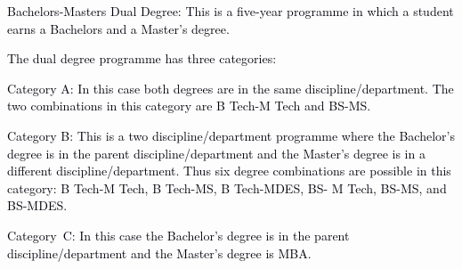 \documentclass[12pt]{article}
\begin{document}
\vspace{\baselineskip}
{\fontsize{9pt}{10.8pt}\selectfont \textcolor[HTML]{00000A}{Bachelors-Masters Dual Degree: This is a five-year programme in which a student earns a Bachelors and a Master’s degree.}\par}\par


\vspace{\baselineskip}
{\fontsize{10pt}{12.0pt}\selectfont \textcolor[HTML]{00000A}{The dual degree programme has three categories:}\par}\par


\vspace{\baselineskip}
\begin{adjustwidth}{0.71in}{0.04in}
{\fontsize{10pt}{12.0pt}\selectfont \textcolor[HTML]{00000A}{Category A: In this case both degrees are in the same discipline/department. The two combinations in this category are B Tech-M Tech and BS-MS.}\par}\par

\end{adjustwidth}


\vspace{\baselineskip}
\begin{adjustwidth}{0.71in}{0.0in}
\begin{justify}
{\fontsize{10pt}{12.0pt}\selectfont \textcolor[HTML]{00000A}{Category B:} \textcolor[HTML]{00000A}{This is a two discipline/department programme where the Bachelor’s degree is in the parent discipline/department and the Master’s degree is in a different discipline/department. Thus six degree combinations are possible in this category: B Tech-M Tech, B Tech-MS, B Tech-MDES, BS- M Tech, BS-MS, and BS-MDES.}\par}
\end{justify}\par

\end{adjustwidth}


\vspace{\baselineskip}
\begin{adjustwidth}{0.21in}{0.0in}
{\fontsize{9pt}{10.8pt}\selectfont \textcolor[HTML]{00000A}{Category\ C:  In this case the Bachelor’s degree is in the parent discipline/department and the Master’s degree is MBA.}\par}\par

\end{adjustwidth}
\end{document}
